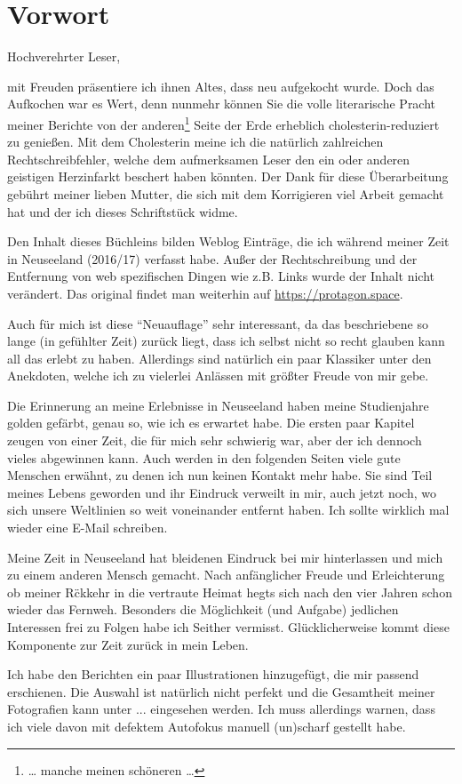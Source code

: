 \chapter*{Vorwort}

Hochverehrter Leser,

mit Freuden präsentiere ich ihnen Altes, dass neu aufgekocht wurde.
Doch das Aufkochen war es Wert, denn nunmehr können Sie die volle
literarische Pracht meiner Berichte von der anderen\footnote{\ldots{}
  manche meinen schöneren \ldots{}} Seite der Erde erheblich
cholesterin-reduziert zu genießen. Mit dem Cholesterin meine ich die
natürlich zahlreichen Rechtschreibfehler, welche dem aufmerksamen
Leser den ein oder anderen geistigen Herzinfarkt beschert haben
könnten. Der Dank für diese Überarbeitung gebührt meiner lieben
Mutter, die sich mit dem Korrigieren viel Arbeit gemacht hat und der
ich dieses Schriftstück widme.

Den Inhalt dieses Büchleins bilden Weblog Einträge, die ich während
meiner Zeit in Neuseeland (2016/17) verfasst habe. Außer der
Rechtschreibung und der Entfernung von web spezifischen Dingen wie
z.B. Links wurde der Inhalt nicht verändert. Das original findet man
weiterhin auf \url{https://protagon.space}.


Auch für mich ist diese ``Neuauflage'' sehr interessant, da das
beschriebene so lange (in gefühlter Zeit) zurück liegt, dass ich
selbst nicht so recht glauben kann all das erlebt zu haben. Allerdings
sind natürlich ein paar Klassiker unter den Anekdoten, welche ich zu
vielerlei Anlässen mit größter Freude von mir gebe.

Die Erinnerung an meine Erlebnisse in Neuseeland haben meine
Studienjahre golden gefärbt, genau so, wie ich es erwartet habe. Die
ersten paar Kapitel zeugen von einer Zeit, die für mich sehr schwierig
war, aber der ich dennoch vieles abgewinnen kann.  Auch werden in den
folgenden Seiten viele gute Menschen erwähnt, zu denen ich nun keinen
Kontakt mehr habe. Sie sind Teil meines Lebens geworden und ihr
Eindruck verweilt in mir, auch jetzt noch, wo sich unsere Weltlinien
so weit voneinander entfernt haben. Ich sollte wirklich mal wieder
eine E-Mail schreiben.

Meine Zeit in Neuseeland hat bleidenen Eindruck bei mir hinterlassen
und mich zu einem anderen Mensch gemacht. Nach anf\"anglicher Freude
und Erleichterung ob meiner R\"ckkehr in die vertraute Heimat hegts
sich nach den vier Jahren schon wieder das Fernweh. Besonders die
M\"oglichkeit (und Aufgabe) jedlichen Interessen frei zu Folgen habe
ich Seither vermisst. Gl\"ucklicherweise kommt diese Komponente zur
Zeit zur\"uck in mein Leben.

Ich habe den Berichten ein paar Illustrationen hinzugefügt, die mir
passend erschienen. Die Auswahl ist natürlich nicht perfekt und die
Gesamtheit meiner Fotografien kann unter ... eingesehen werden.
Ich muss allerdings warnen, dass ich viele davon mit defektem
Autofokus manuell (un)scharf gestellt habe.

